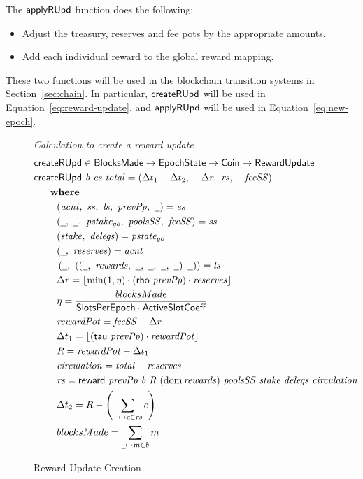 The $\mathsf{applyRUpd}$ function does the following:
    \begin{itemize}
      \item Adjust the treasury, reserves and fee pots by the appropriate amounts.
      \item Add each individual reward to the global reward mapping.
    \end{itemize}

These two functions will be used in the blockchain transition systems in Section~\ref{sec:chain}.
In particular,
$\mathsf{createRUpd}$ will be used in Equation~\ref{eq:reward-update},
and $\mathsf{applyRUpd}$ will be used in Equation~\ref{eq:new-epoch}.

\begin{figure}[htb]
  \emph{Calculation to create a reward update}
  \begin{align*}
    & \fun{createRUpd} \in \BlocksMade \to \EpochState \to \Coin \to \RewardUpdate \\
    & \createRUpd{b}{es}{total} = \left(
      \Delta t_1+\Delta t_2,-~\Delta r,~\var{rs},~-\var{feeSS}\right) \\
    & ~~~\where \\
    & ~~~~~~~(\var{acnt},~\var{ss},~\var{ls},~\var{prevPp},~\wcard) = \var{es} \\
    & ~~~~~~~(\wcard,~\wcard,~\var{pstake_{go}},~\var{poolsSS},~\var{feeSS}) = \var{ss}\\
    & ~~~~~~~(\var{stake},~\var{delegs}) = \var{pstate_{go}} \\
    & ~~~~~~~(\wcard,~\var{reserves}) = \var{acnt} \\
    & ~~~~~~~\left(
      \wcard,~
      \left(
      \left(\wcard,~\var{rewards},~\wcard,~\wcard,~\wcard,~\wcard\right)~
      \wcard
      \right)
      \right) = \var{ls} \\
    & ~~~~~~~\Delta r = \floor*{\min(1,\eta) \cdot (\fun{rho}~\var{prevPp}) \cdot
      \var{reserves}}
    \\
    & ~~~~~~~\eta = \frac{blocksMade}{\SlotsPerEpoch \cdot \ActiveSlotCoeff} \\
    & ~~~~~~~\var{rewardPot} = \var{feeSS} + \Delta r \\
    & ~~~~~~~\Delta t_1 = \floor*{(\fun{tau}~\var{prevPp}) \cdot \var{rewardPot}} \\
    & ~~~~~~~\var{R} = \var{rewardPot} - \Delta t_1 \\
    & ~~~~~~~\var{circulation} = \var{total} - \var{reserves} \\
    & ~~~~~~~\var{rs}
      = \reward{prevPp}{b}{R}{(\dom{rewards})}{poolsSS}{stake}{delegs}{circulation} \\
    & ~~~~~~~\Delta t_{2} = R - \left(\sum\limits_{\_\mapsto c\in\var{rs}}c\right) \\
    & ~~~~~~~blocksMade = \sum_{\wcard \mapsto m \in b}m
  \end{align*}

  \caption{Reward Update Creation}
  \label{fig:functions:reward-update-creation}
\end{figure}

